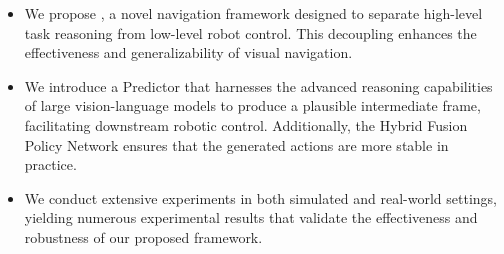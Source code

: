 \begin{itemize}
%
\item We propose \mname, a novel navigation framework designed to separate high-level task reasoning from low-level robot control. This decoupling enhances the effectiveness and generalizability of visual navigation.

\item We introduce a Predictor that harnesses the advanced reasoning capabilities of large vision-language models to produce a plausible intermediate frame, facilitating downstream robotic control. Additionally, the Hybrid Fusion Policy Network ensures that the generated actions are more stable in practice.
%
%
\item We conduct extensive experiments in both simulated and real-world settings, yielding numerous experimental results that validate the effectiveness and robustness of our proposed framework.
\end{itemize}